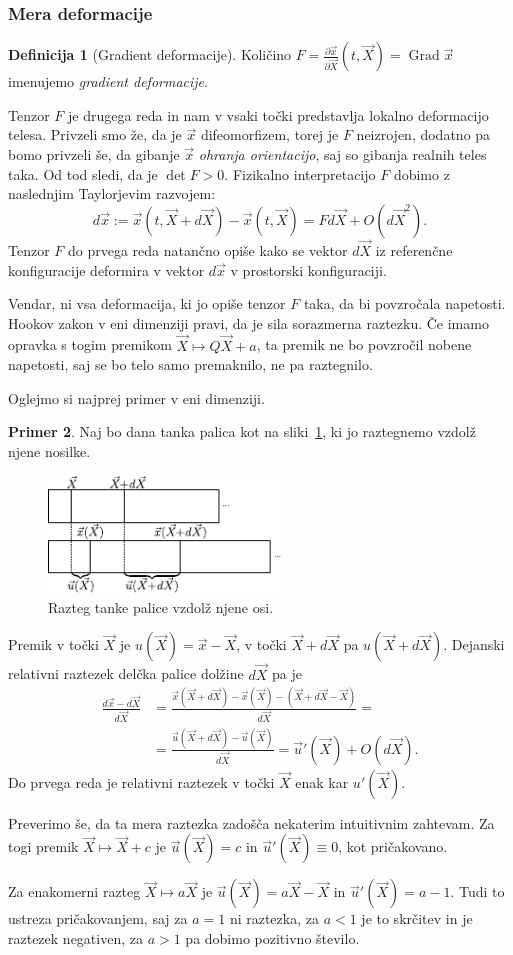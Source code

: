 \documentclass[a4paper,twoside]{article}
\theoremstyle{definition} %
\newtheorem{definicija}{Definicija}[section]
\newtheorem{primer}[definicija]{Primer}
\theoremstyle{plain} %
\numberwithin{equation}{section}
\newcommand{\Grad}{\operatorname{Grad}}
\newcommand{\dpar}[2]{\ensuremath{\frac{\partial #1}{\partial #2}}}
\newcommand{\vu}{\vec{u}}
\newcommand{\vX}{\vec{X}}
\newcommand{\vx}{\vec{x}}
\begin{document}
\subsubsection{Mera deformacije}
\begin{definicija}[Gradient deformacije]
  Količino $F = \dpar{\vx}{\vX}(t, \vX) = \Grad \vx$ imenujemo \emph{gradient
  deformacije}.
\end{definicija}

Tenzor $F$ je drugega reda in nam v vsaki točki predstavlja lokalno deformacijo
telesa. Privzeli smo že, da je $\vx$ difeomorfizem, torej je $F$ neizrojen,
dodatno pa bomo privzeli še, da gibanje $\vx$ \emph{ohranja orientacijo}, saj
so gibanja realnih teles taka. Od tod sledi, da je $\det F > 0$.
Fizikalno interpretacijo $F$ dobimo z naslednjim Taylorjevim razvojem:
\[
  d\vx := \vx(t, \vX+d\vX) - \vx(t, \vX) = F d\vX + O(d\vX^2).
\]
Tenzor $F$ do prvega reda natančno opiše kako se vektor $d\vX$ iz referenčne
konfiguracije deformira v vektor $d\vx$ v prostorski konfiguraciji.

Vendar, ni vsa deformacija, ki jo opiše tenzor $F$ taka, da bi povzročala
napetosti. Hookov zakon v eni dimenziji pravi, da je sila sorazmerna raztezku.
Če imamo opravka s togim premikom $\vX \mapsto Q\vX + a$, ta premik ne bo povzročil
nobene napetosti, saj se bo telo samo premaknilo, ne pa raztegnilo.

Oglejmo si najprej primer v eni dimenziji.
\begin{primer}
Naj bo dana tanka palica kot na sliki~\ref{fig:palica}, ki jo raztegnemo vzdolž
njene nosilke.
\begin{figure}[h]
  \centering
  \includegraphics[width=0.55\textwidth]{images/stretch1d.pdf}
  \caption{Razteg tanke palice vzdolž njene osi.}
  \label{fig:palica}
\end{figure}
Premik v točki $\vX$ je $u(\vX) = \vx - \vX$, v točki $\vX+d\vX$ pa $u(\vX+d\vX)$.
Dejanski relativni raztezek delčka palice dolžine $d\vX$ pa je
\begin{align*}
  \frac{d\vx - d\vX}{d\vX} &= \frac{\vx(\vX+d\vX) - \vx(\vX) - (\vX + d\vX - \vX)}{d\vX} = \\ &=
  \frac{\vu(\vX + d\vX) - \vu(\vX)}{d\vX} = \vu'(\vX) + O(d\vX).
\end{align*}
Do prvega reda je relativni raztezek v točki $\vX$ enak kar $u'(\vX)$.

Preverimo še, da ta mera raztezka zadošča nekaterim intuitivnim zahtevam. Za
togi premik $\vX \mapsto \vX + c$ je $\vu(\vX) = c$ in $\vu'(\vX) \equiv 0$, kot
pričakovano.

Za enakomerni razteg $\vX \mapsto a\vX$ je $\vu(\vX) = a\vX - \vX$ in $\vu'(\vX) = a - 1$. Tudi
to ustreza pričakovanjem, saj za $a = 1$ ni raztezka, za $a< 1$ je to skrčitev
in je raztezek negativen, za $a>1$ pa dobimo pozitivno število.
\end{primer}
\end{document}
